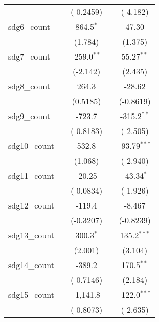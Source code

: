 \begin{tabular}{lcccc}
                     &                & (-0.2459)      &                & (-4.182)\\   
   sdg6\_count       &                & 864.5$^{*}$    &                & 47.30\\   
                     &                & (1.784)        &                & (1.375)\\   
   sdg7\_count       &                & -259.0$^{**}$  &                & 55.27$^{**}$\\   
                     &                & (-2.142)       &                & (2.435)\\   
   sdg8\_count       &                & 264.3          &                & -28.62\\   
                     &                & (0.5185)       &                & (-0.8619)\\   
   sdg9\_count       &                & -723.7         &                & -315.2$^{**}$\\   
                     &                & (-0.8183)      &                & (-2.505)\\   
   sdg10\_count      &                & 532.8          &                & -93.79$^{***}$\\   
                     &                & (1.068)        &                & (-2.940)\\   
   sdg11\_count      &                & -20.25         &                & -43.34$^{*}$\\   
                     &                & (-0.0834)      &                & (-1.926)\\   
   sdg12\_count      &                & -119.4         &                & -8.467\\   
                     &                & (-0.3207)      &                & (-0.8239)\\   
   sdg13\_count      &                & 300.3$^{*}$    &                & 135.2$^{***}$\\   
                     &                & (2.001)        &                & (3.104)\\   
   sdg14\_count      &                & -389.2         &                & 170.5$^{**}$\\   
                     &                & (-0.7146)      &                & (2.184)\\   
   sdg15\_count      &                & -1,141.8       &                & -122.0$^{***}$\\   
                     &                & (-0.8073)      &                & (-2.635)\\   

\end{tabular}
